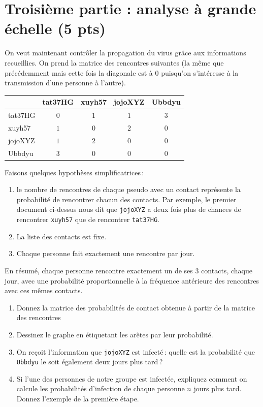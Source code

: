 \documentclass[11pt,a4paper]{article}
\begin{document}
\section{Troisième partie : analyse à grande échelle (5 pts)}

On veut maintenant contrôler la propagation du virus grâce aux informations
recueillies. On prend la  matrice des rencontres suivantes (la même
que précédemment mais
cette fois  la diagonale est à 0 puisqu'on s'intéresse à la transmission
d'une personne à l'autre).

\begin{center}
\begin{tabular}{l|c|c|c|c}
            & tat37HG & xuyh57 & jojoXYZ & Ubbdyu \\ \hline  
   tat37HG  & $0$ &  $1$   & $1$     & $3$   \\
   xuyh57   & $1$    & $0$  & $2$   & $0$ \\
   jojoXYZ  & $1$   & $2$  &   $0$  &  $0$        \\
   Ubbdyu   &  $3$  &  $0$         & 0           & $0$     \\\hline
   \end{tabular}
\end{center}

Faisons quelques hypothèses simplificatrices\,:
\begin{enumerate}
  \item le nombre de rencontres de chaque pseudo avec un contact
    représente la probabilité de rencontrer chacun des contacts. 
    Par exemple, le premier document ci-dessus nous dit que \texttt{jojoXYZ} 
    a deux fois plus de chances de rencontrer \texttt{xuyh57} que 
    de rencontrer \texttt{tat37HG}.
   \item La liste des  contacts  est fixe. 
    \item Chaque personne  fait exactement une rencontre par jour.
\end{enumerate}

En résumé, chaque personne rencontre exactement un de ses 3 contacts, chaque jour,
avec une probabilité proportionnelle à la fréquence antérieure des rencontres avec
ces mêmes contacts.

\begin{enumerate}
   \item Donnez la matrice des probabilités de contact obtenue à partir de la
   matrice des rencontres 

   \item Dessinez le graphe en étiquetant les arêtes par leur probabilité.
   \item On reçoit l'information que \texttt{jojoXYZ} est infecté\,: quelle
   est la probabilité que \texttt{Ubbdyu} le soit également deux jours plus tard\,?
   \item Si l'une des personnes de notre groupe est infectée,
     expliquez comment on calcule
     les probabilités d'infection de chaque personne $n$ jours plus tard. Donnez
     l'exemple de la première étape.
 \end{enumerate}
\end{document}
